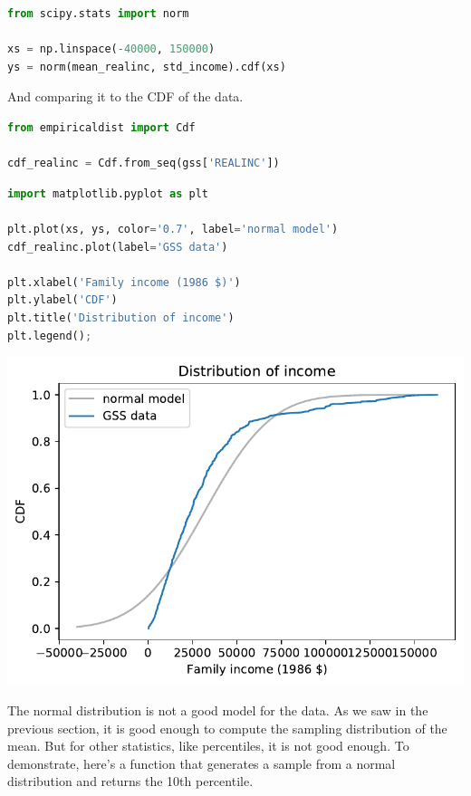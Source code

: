 \begin{lstlisting}[language=Python,style=source]
from scipy.stats import norm

xs = np.linspace(-40000, 150000)
ys = norm(mean_realinc, std_income).cdf(xs)
\end{lstlisting}

And comparing it to the CDF of the data.

\begin{lstlisting}[language=Python,style=source]
from empiricaldist import Cdf

cdf_realinc = Cdf.from_seq(gss['REALINC'])
\end{lstlisting}

\begin{lstlisting}[language=Python,style=source]
import matplotlib.pyplot as plt

plt.plot(xs, ys, color='0.7', label='normal model')
cdf_realinc.plot(label='GSS data')

plt.xlabel('Family income (1986 $)')
plt.ylabel('CDF')
plt.title('Distribution of income')
plt.legend();
\end{lstlisting}

\begin{center}
\includegraphics[scale=0.75]{12_bootstrap_files/12_bootstrap_29_0.pdf}
\end{center}

The normal distribution is not a good model for the data. As we saw in
the previous section, it is good enough to compute the sampling
distribution of the mean. But for other statistics, like percentiles, it
is not good enough. To demonstrate, here's a function that generates a
sample from a normal distribution and returns the 10th percentile.

